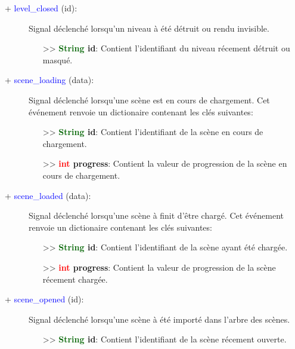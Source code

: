 \documentclass[a4paper, 11pt]{article}
\begin{document}
	\begin{description}
		\item [+ \textcolor{blue}{level\_closed} (id):] Signal déclenché lorsqu'un niveau à été détruit ou 
		rendu invisible.
		\begin{itemize}
			\item [>> \textbf{\textcolor{darkgreen}{String} id}:] Contient l'identifiant du niveau récement
			détruit ou masqué.\\
		\end{itemize}
	\end{description}
	\begin{description}
		\item [+ \textcolor{blue}{scene\_loading} (data):] Signal déclenché lorsqu'une scène est en cours de 
		chargement. Cet \\événement renvoie un dictionaire contenant les clés suivantes:
		\begin{itemize}
			\item [>> \textbf{\textcolor{darkgreen}{String} id}:] Contient l'identifiant de la scène en 
			cours de chargement.
			\item [>> \textbf{\textcolor{red}{int} progress}:] Contient la valeur de progression de la scène 
			en cours de chargement.\\
		\end{itemize}
	\end{description}
	\begin{description}
		\item [+ \textcolor{blue}{scene\_loaded} (data):] Signal déclenché lorsqu'une scène à finit d'être 
		chargé. Cet événement renvoie un dictionaire contenant les clés suivantes:
		\begin{itemize}
			\item [>> \textbf{\textcolor{darkgreen}{String} id}:] Contient l'identifiant de la scène ayant 
			été chargée.
			\item [>> \textbf{\textcolor{red}{int} progress}:] Contient la valeur de progression de la scène 
			récement chargée.\\
		\end{itemize}
	\end{description}
	\begin{description}
		\item [+ \textcolor{blue}{scene\_opened} (id):] Signal déclenché lorsqu'une scène à été importé dans 
		l'arbre des scènes.
		\begin{itemize}
			\item [>> \textbf{\textcolor{darkgreen}{String} id}:] Contient l'identifiant de la scène 
			récement ouverte.\\
		\end{itemize}
	\end{description}
\end{document}
